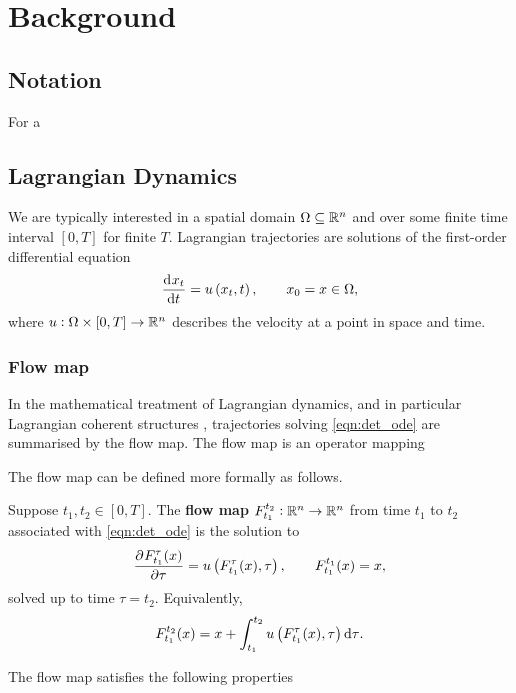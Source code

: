 
\chapter{Background}


\section{Notation}


For a



\section{Lagrangian Dynamics}


We are typically interested in a spatial domain \(\Omega \subseteq \mathbb{R}^n\) and over some finite time interval \([0,T]\) for finite \(T\).
Lagrangian trajectories are solutions of the first-order differential equation
\begin{equation}
	\dod{x_t}{t} = u\left(x_t, t\right), \qquad x_0 = x \in \Omega,
	\label{eqn:det_ode}
\end{equation}
where \(u: \Omega\times[0,T] \to \mathbb{R}^n\) describes the velocity at a point in space and time.





\subsection{Flow map}
In the mathematical treatment of Lagrangian dynamics, and in particular Lagrangian coherent structures \citep{BalasuriyaEtAl_2018_GeneralizedLagrangianCoherent}, trajectories solving \eqref{eqn:det_ode} are summarised by the flow map.
The flow map is an operator mapping

The flow map can be defined more formally as follows.
\begin{defn}
	Suppose \(t_1, t_2 \in [0,T]\).
	The \textbf{flow map} \(F_{t_1}^{t_2}: \mathbb{R}^n \to \mathbb{R}^n\) from time \(t_1\) to \(t_2\) associated with \eqref{eqn:det_ode} is the solution to
	\[
		\dpd{F_{t_1}^{\tau}(x)}{\tau} = u\left(F_{t_1}^\tau(x), \tau\right), \qquad F_{t_1}^{t_1}(x) = x,
	\]
	solved up to time \(\tau = t_2\).
	Equivalently,
	\[
		F_{t_1}^{t_2}(x) = x + \int_{t_1}^{t_2}{u\left(F_{t_1}^\tau(x), \tau\right)\dif\tau}.
	\]
\end{defn}
The flow map satisfies the following properties


